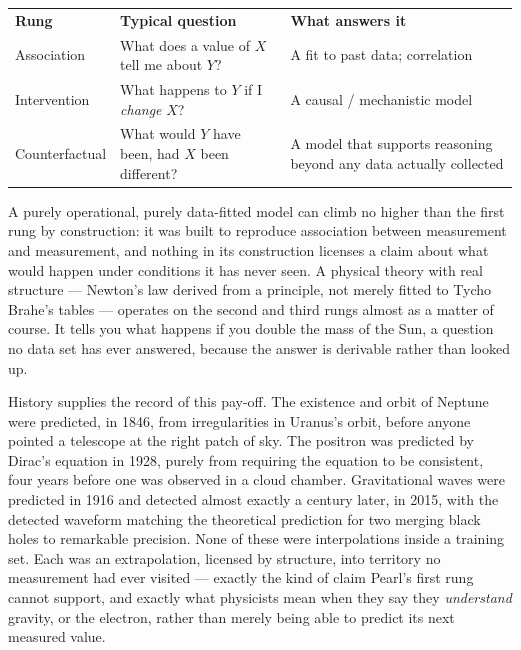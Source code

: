 \begin{center}
\begin{tabular}{@{}>{\raggedright\arraybackslash}p{2.6cm} >{\raggedright\arraybackslash}p{4.6cm} >{\raggedright\arraybackslash}p{4.6cm}@{}}
\textbf{Rung} & \textbf{Typical question} & \textbf{What answers it} \\
Association & What does a value of $X$ tell me about $Y$? & A fit to past data; correlation \\
Intervention & What happens to $Y$ if I \emph{change} $X$? & A causal / mechanistic model \\
Counterfactual & What would $Y$ have been, had $X$ been different? & A model
    that supports reasoning beyond any data actually collected \\
\end{tabular}
\end{center}

A purely operational, purely data-fitted model can climb no higher than the
first rung by construction: it was built to reproduce association between
measurement and measurement, and nothing in its construction licenses a claim
about what would happen under conditions it has never seen. A physical theory
with real structure --- Newton's law derived from a principle, not merely
fitted to Tycho Brahe's tables --- operates on the second and third rungs
almost as a matter of course. It tells you what happens if you double the mass
of the Sun, a question no data set has ever answered, because the answer is
derivable rather than looked up.

History supplies the record of this pay-off. The existence and orbit of Neptune
were predicted, in 1846, from irregularities in Uranus's orbit, before anyone
pointed a telescope at the right patch of sky. The positron was predicted by
Dirac's equation in 1928, purely from requiring the equation to be consistent,
four years before one was observed in a cloud chamber. Gravitational waves were
predicted in 1916 and detected almost exactly a century later, in 2015, with
the detected waveform matching the theoretical prediction for two merging black
holes to remarkable precision. None of these were interpolations inside a
training set. Each was an extrapolation, licensed by structure, into territory
no measurement had ever visited --- exactly the kind of claim Pearl's first
rung cannot support, and exactly what physicists mean when they say they
\emph{understand} gravity, or the electron, rather than merely being able to
predict its next measured value.

